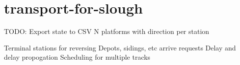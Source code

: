 \chapter{transport-\/for-\/slough }
\hypertarget{md_README}{}\label{md_README}
\label{md_README_autotoc_md0}%
%


TODO\+: Export state to CSV N platforms with direction per station

Terminal stations for reversing Depots, sidings, etc  arrive requests Delay and delay propogation Scheduling for multiple tracks 
